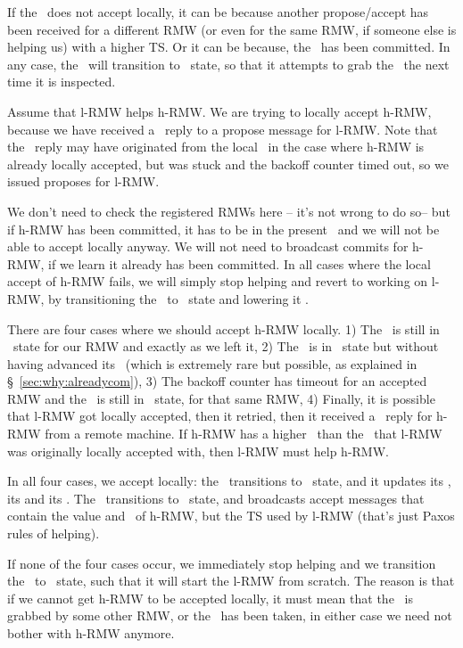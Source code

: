 If the \kv~does not accept locally, it can be because another propose/accept has been received for a different RMW (or even for the same RMW, if someone else is helping us) with a higher TS.
Or it can be because, the \logno~has been committed. In any case, the \locentry~will transition to \need~state, so that it attempts to grab the \kv~the next time it is inspected.

\custvspace
{}
Assume that l-RMW helps h-RMW.
We are trying to locally accept h-RMW, because we have received a \lowacc~reply to a propose message for l-RMW. Note that the \lowacc~reply may have originated from the local \kv~in the case where h-RMW is already locally accepted, but was stuck and the backoff counter timed out, so we issued proposes for l-RMW.

We don't need to check the registered RMWs here -- it's not wrong to do so-- but if h-RMW has been committed, it has to be in the present \logno~and we will not be able to accept locally anyway. We will not need to broadcast commits for h-RMW, if we learn it already has been committed. In all cases where the local accept of h-RMW fails, we will simply stop helping and revert to working on l-RMW, by transitioning the \locentry~to \need~state and lowering it \helpflag. 


There are four cases where we should accept h-RMW locally.
1) The \kv~is still in \proped~state for our RMW and exactly as we left it,
2) The \kv~is in \invalid~state but without having advanced its \comlogno~(which is extremely rare but possible, as explained in \S~\ref{sec:why:alreadycom}), 
3) The backoff counter has timeout for an accepted RMW and the \kv~is still in \acced~state, for that same RMW,
4) Finally, it is possible that l-RMW got locally accepted, then it retried, then it received a \lowacc~reply for h-RMW from a remote machine. If h-RMW has a higher \accts~than the \accts~that l-RMW was originally locally accepted with, then l-RMW must help h-RMW.

In all four cases, we accept locally: \ie the \kv~transitions to \acced~state, and it updates its \rmw, its \accts and its \accval.
The \locentry~transitions to \acced~state, and broadcasts accept messages that contain the value and \rmw~of h-RMW, but the TS used by l-RMW (that's just Paxos rules of helping).

If none of the four cases occur, we immediately stop helping and we transition the \locentry~to \need~state, such that it will start the l-RMW from scratch. The reason is that if we cannot get h-RMW to be accepted locally, it must mean that the \kv~is grabbed by some other RMW, or the \logno~has been taken, in either case we need not bother with h-RMW anymore.

